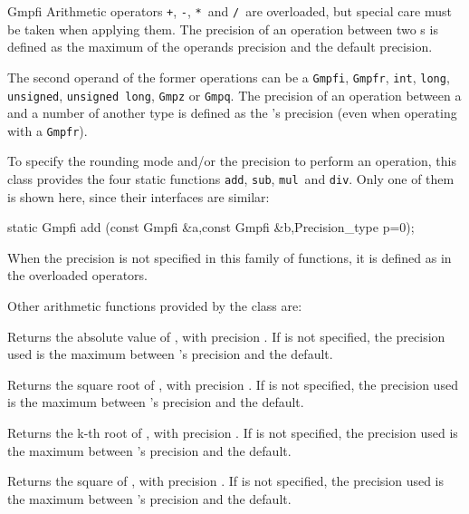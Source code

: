 \begin{ccRefClass} {Gmpfi}
Arithmetic operators \verb=+=, \verb=-=, \verb=*=\ and \verb=/=\ are
overloaded, but special care must be taken when applying them. The
precision of an operation between two s is defined as the
maximum of the operands precision and the default precision.

The second operand of the former operations can be a \verb=Gmpfi=,
\verb=Gmpfr=, \verb=int=, \verb=long=, \verb=unsigned=,
\verb=unsigned long=, \verb=Gmpz= or \verb=Gmpq=. The precision of an
operation between a  and a number of another type is defined
as the 's precision (even when operating with a \verb=Gmpfr=).

To specify the rounding mode and/or the precision to perform an operation,
this class provides the four static functions \verb=add=, \verb=sub=,
\verb=mul=~and \verb=div=. Only one of them is shown here, since their
interfaces are similar:

\ccFunction
        {static Gmpfi add (const Gmpfi &a,const Gmpfi &b,Precision_type p=0);}
        {}

When the precision is not specified in this family of functions, it is
defined as in the overloaded operators.



Other arithmetic functions provided by the class are:

        {Returns the absolute value of \ccVar, with precision .
        If  is not specified, the precision used is the maximum
        between \ccVar 's precision and the default.}

        {Returns the square root of \ccVar, with precision .
        If  is not specified, the precision used is the maximum
        between \ccVar 's precision and the default.}

        {Returns the k-th root of \ccVar, with precision .
        If  is not specified, the precision used is the maximum
        between \ccVar 's precision and the default.}

        {Returns the square of \ccVar, with precision . If
         is not specified, the precision used is the maximum
        between \ccVar 's precision and the default.}



\end{ccRefClass}

